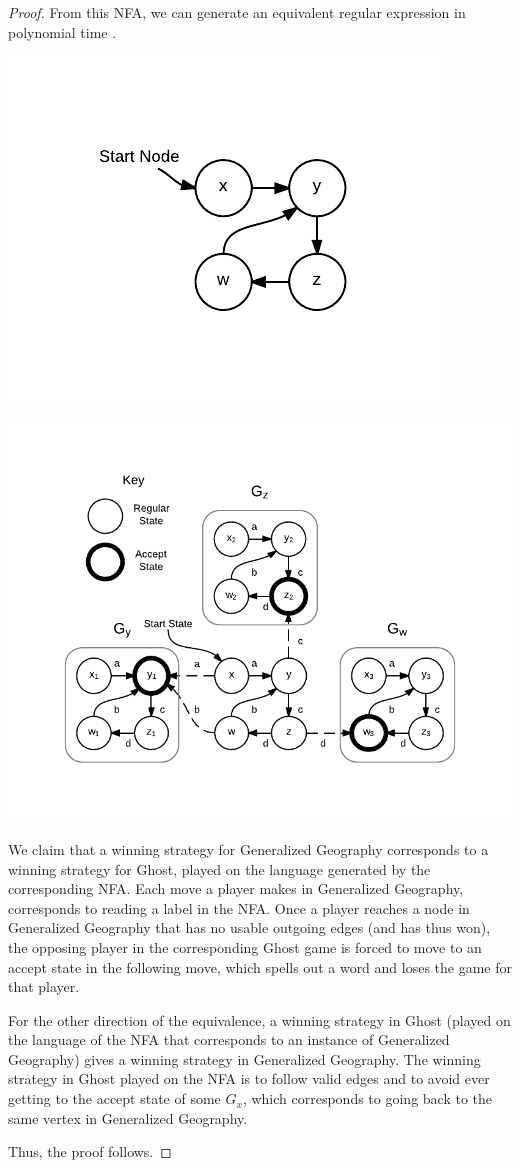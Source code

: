 \documentclass[11pt]{article}
\begin{document}
\begin{proof}
From this NFA, we can generate an equivalent regular expression in polynomial time \cite{theoryofcomp}.

\includegraphics{Ghost1.pdf}

\includegraphics{Ghost2.pdf}

We claim that a winning strategy for Generalized Geography corresponds to a winning strategy for Ghost, played on the language generated by the corresponding NFA. Each move a player makes in Generalized Geography, corresponds to reading a label in the NFA. Once a player reaches a node in Generalized Geography that has no usable outgoing edges (and has thus won), the opposing player in the corresponding Ghost game is forced to move to an accept state in the following move, which spells out a word and loses the game for that player. 

For the other direction of the equivalence, a winning strategy in Ghost (played on the language of the NFA that corresponds to an instance of Generalized Geography) gives a winning strategy in Generalized Geography. The winning strategy in Ghost played on the NFA is to follow valid edges and to avoid ever getting to the accept state of some $G_x$, which corresponds to going back to the same vertex in Generalized Geography.

Thus, the proof follows. 
\end{proof}
\end{document}
